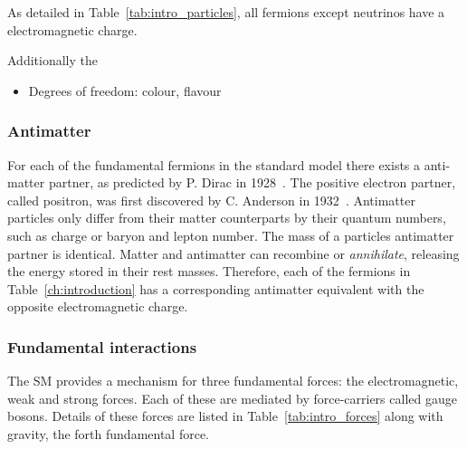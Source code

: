 As detailed in Table~\ref{tab:intro_particles}, all fermions except neutrinos have a electromagnetic charge. 

 Additionally the 

{\color{Red}
\begin{itemize}
\item Degrees of freedom: colour, flavour
\end{itemize}}


\subsubsection{Antimatter}

For each of the fundamental fermions in the standard model there exists a anti-matter partner, as predicted by P. Dirac in 1928~\cite{Dirac610}. The positive electron partner, called positron, was first discovered by C. Anderson in 1932~\cite{PhysRev.43.491}.
Antimatter particles only differ from their matter counterparts by their quantum numbers, such as charge or baryon and lepton number. The mass of a particles antimatter partner is identical. Matter and antimatter can recombine or \emph{annihilate}, releasing the energy stored in their rest masses. 
Therefore, each of the fermions in Table~\ref{ch:introduction} has a corresponding antimatter equivalent with the opposite electromagnetic charge.  

\subsubsection{Fundamental interactions}

The SM provides a mechanism for three fundamental forces: the electromagnetic, weak and strong forces. Each of these are mediated by force-carriers called gauge bosons.
Details of these forces are listed in Table~\ref{tab:intro_forces} along with gravity, the forth fundamental force. 

